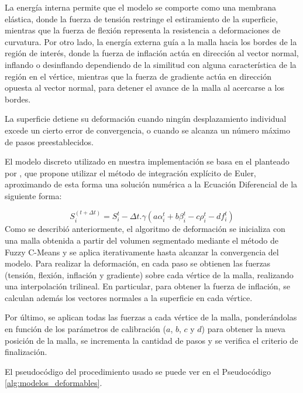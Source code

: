La energía interna permite que el modelo se comporte como una membrana elástica, donde la fuerza de tensión restringe el estiramiento de la superficie, mientras que la fuerza de flexión representa la resistencia a deformaciones de curvatura. Por otro lado, la energía externa guía a la malla hacia los bordes de la región de interés, donde la fuerza de inflación actúa en dirección al vector normal, inflando o desinflando dependiendo de la similitud con alguna característica de la región en el vértice, mientras que la fuerza de gradiente actúa en dirección opuesta al vector normal, para detener el avance de la malla al acercarse a los bordes. 

La superficie detiene su deformación cuando ningún desplazamiento individual excede un cierto error de convergencia, o cuando se alcanza un número máximo de pasos preestablecidos.

El modelo discreto utilizado en nuestra implementación se basa en el planteado por \citep{mcinerney2000t}, que propone utilizar el método de integración explícito de Euler, aproximando de esta forma una solución numérica a la Ecuación Diferencial de la siguiente forma:

%
\begin{equation}
S^{(t+\Delta t)}_{i} = S_{i}^{t} - \Delta t.\gamma(a\alpha_{i}^{t} + b\beta_{i}^{t} - c\rho_{i}^{t} - df_{i}^{t})
\end{equation}
%
Como se describió anteriormente, el algoritmo de deformación se inicializa con una malla obtenida a partir del volumen segmentado mediante el método de Fuzzy C-Means y se aplica iterativamente hasta alcanzar la convergencia del modelo. Para realizar la deformación, en cada paso se obtienen las fuerzas (tensión, flexión, inflación y gradiente) sobre cada vértice de la malla, realizando una interpolación trilineal. En particular, para obtener la fuerza de inflación, se calculan además los vectores normales a la superficie en cada vértice. 

Por último, se aplican todas las fuerzas a cada vértice de la malla, ponderándolas en función de los parámetros de calibración ($a$, $b$, $c$ y $d$) para obtener la nueva posición de la malla, se incrementa la cantidad de pasos y se verifica el criterio de finalización.

El pseudocódigo del procedimiento usado se puede ver en el Pseudocódigo \ref{alg:modelos_deformables}.

